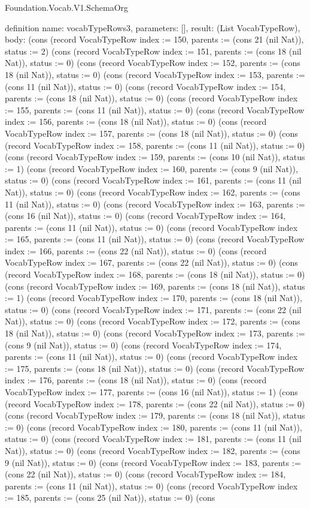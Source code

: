 \begin{lexlean}{Foundation.Vocab.V1.SchemaOrg}
\begin{semanticmodule}
definition{
  name: vocabTypeRows3,
  parameters: [],
  result: (List VocabTypeRow),
  body: (cons (record VocabTypeRow {index := 150, parents := (cons 21 (nil Nat)), status := 2}) (cons (record VocabTypeRow {index := 151, parents := (cons 18 (nil Nat)), status := 0}) (cons (record VocabTypeRow {index := 152, parents := (cons 18 (nil Nat)), status := 0}) (cons (record VocabTypeRow {index := 153, parents := (cons 11 (nil Nat)), status := 0}) (cons (record VocabTypeRow {index := 154, parents := (cons 18 (nil Nat)), status := 0}) (cons (record VocabTypeRow {index := 155, parents := (cons 11 (nil Nat)), status := 0}) (cons (record VocabTypeRow {index := 156, parents := (cons 18 (nil Nat)), status := 0}) (cons (record VocabTypeRow {index := 157, parents := (cons 18 (nil Nat)), status := 0}) (cons (record VocabTypeRow {index := 158, parents := (cons 11 (nil Nat)), status := 0}) (cons (record VocabTypeRow {index := 159, parents := (cons 10 (nil Nat)), status := 1}) (cons (record VocabTypeRow {index := 160, parents := (cons 9 (nil Nat)), status := 0}) (cons (record VocabTypeRow {index := 161, parents := (cons 11 (nil Nat)), status := 0}) (cons (record VocabTypeRow {index := 162, parents := (cons 11 (nil Nat)), status := 0}) (cons (record VocabTypeRow {index := 163, parents := (cons 16 (nil Nat)), status := 0}) (cons (record VocabTypeRow {index := 164, parents := (cons 11 (nil Nat)), status := 0}) (cons (record VocabTypeRow {index := 165, parents := (cons 11 (nil Nat)), status := 0}) (cons (record VocabTypeRow {index := 166, parents := (cons 22 (nil Nat)), status := 0}) (cons (record VocabTypeRow {index := 167, parents := (cons 22 (nil Nat)), status := 0}) (cons (record VocabTypeRow {index := 168, parents := (cons 18 (nil Nat)), status := 0}) (cons (record VocabTypeRow {index := 169, parents := (cons 18 (nil Nat)), status := 1}) (cons (record VocabTypeRow {index := 170, parents := (cons 18 (nil Nat)), status := 0}) (cons (record VocabTypeRow {index := 171, parents := (cons 22 (nil Nat)), status := 0}) (cons (record VocabTypeRow {index := 172, parents := (cons 18 (nil Nat)), status := 0}) (cons (record VocabTypeRow {index := 173, parents := (cons 9 (nil Nat)), status := 0}) (cons (record VocabTypeRow {index := 174, parents := (cons 11 (nil Nat)), status := 0}) (cons (record VocabTypeRow {index := 175, parents := (cons 18 (nil Nat)), status := 0}) (cons (record VocabTypeRow {index := 176, parents := (cons 18 (nil Nat)), status := 0}) (cons (record VocabTypeRow {index := 177, parents := (cons 16 (nil Nat)), status := 1}) (cons (record VocabTypeRow {index := 178, parents := (cons 22 (nil Nat)), status := 0}) (cons (record VocabTypeRow {index := 179, parents := (cons 18 (nil Nat)), status := 0}) (cons (record VocabTypeRow {index := 180, parents := (cons 11 (nil Nat)), status := 0}) (cons (record VocabTypeRow {index := 181, parents := (cons 11 (nil Nat)), status := 0}) (cons (record VocabTypeRow {index := 182, parents := (cons 9 (nil Nat)), status := 0}) (cons (record VocabTypeRow {index := 183, parents := (cons 22 (nil Nat)), status := 0}) (cons (record VocabTypeRow {index := 184, parents := (cons 11 (nil Nat)), status := 0}) (cons (record VocabTypeRow {index := 185, parents := (cons 25 (nil Nat)), status := 0}) (cons }
\end{semanticmodule}
\end{lexlean}
